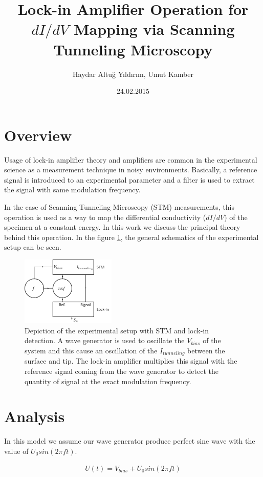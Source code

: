 \documentclass[10pt,a4paper,notitlepage]{article}
\title{Lock-in Amplifier Operation for $dI/dV$ Mapping via Scanning Tunneling Microscopy\vspace{1cm}}
\author{Haydar Altu\u{g} Y{\i}ld{\i}r{\i}m, Umut Kamber}
\begin{document}
\date{24.02.2015}
\maketitle{}
\tableofcontents
\section{Overview}
Usage of lock-in amplifier theory and amplifiers are common in the
experimental science as a measurement technique in noisy environments. Basically, a
reference signal is introduced to an experimental parameter and a filter is used to
extract the signal with same modulation frequency.

In the case of Scanning Tunneling Microscopy (STM) measurements, this
operation is used as a way to map the differential conductivity ($dI/dV$) of the
specimen at a constant energy. In this work we discuss the principal theory behind
this operation.
In the figure \ref{lockin}, the general schematics of the experimental setup can be seen.

\begin{figure}[!ht]
  \centering
  \includegraphics[width=0.4\textwidth]{images/lockin.png}
  \caption{Depiction of the experimental setup with STM and lock-in detection. A wave generator is
used to oscillate the $V_{bias}$ of the system and this cause an oscillation of the $I_{tunneling}$ between the
surface and tip. The lock-in amplifier multiplies this signal with the reference signal coming from the
wave generator to detect the quantity of signal at the exact modulation frequency.}
  \label{lockin}
\end{figure}

\section{Analysis}

In this model we assume our wave generator produce perfect sine wave with the value of $U_0sin(2 \pi ft)$.

\begin{equation}
\label{signal}
\begin{split}
U(t)=V_{bias}+U_0sin(2 \pi ft)
\end{split}
\end{equation}
\end{document}
